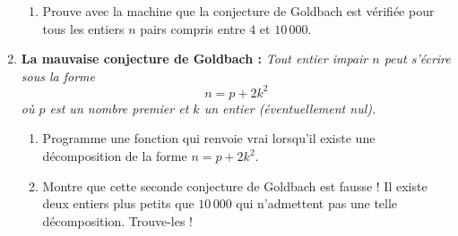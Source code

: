 \documentclass[11pt,class=report,crop=false]{standalone}
\begin{document}
\begin{activite}
\begin{enumerate}
\begin{enumerate}
   \item Prouve avec la machine que la conjecture de Goldbach est vérifiée pour tous les entiers $n$ pairs compris entre $4$ et $10\,000$.
    
  \end{enumerate}
  
  \item \textbf{La mauvaise conjecture de Goldbach :} \emph{Tout entier impair $n$ peut s'écrire sous la forme
  $$n = p + 2k^2$$
où $p$ est un nombre premier et $k$ un entier (éventuellement nul).}
  
  \begin{enumerate}
    \item Programme une fonction  qui renvoie \og{}vrai\fg{} lorsqu'il existe une décomposition de la forme $n=p+2k^2$.
    
    \item Montre que cette seconde conjecture de Goldbach est fausse ! Il existe deux entiers plus petits que $10\,000$ qui n'admettent pas une telle décomposition. Trouve-les !
  \end{enumerate} 
\end{enumerate}   
     
\end{activite}



\end{document}
